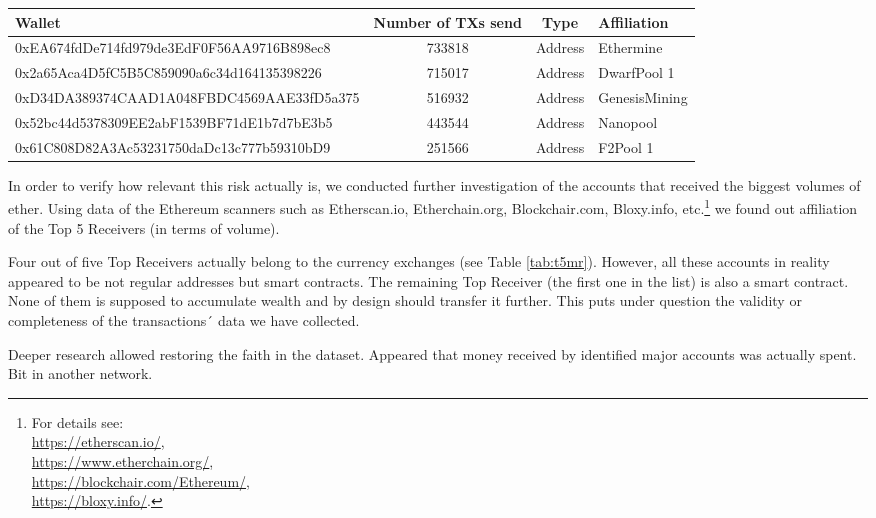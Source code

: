 \begin{table}
\centering
{}
\label{tabt5ms}
\begin{adjustbox}{width=0.9\linewidth}
\begin{tabular}{p{7cm}ccl}
  \hline
Wallet & Number of TXs send & Type & Affiliation \\
  \hline
  0xEA674fdDe714fd979de3EdF0F56AA9716B898ec8 & 733818 & Address & Ethermine \\
  0x2a65Aca4D5fC5B5C859090a6c34d164135398226 & 715017 & Address & DwarfPool 1 \\
  0xD34DA389374CAAD1A048FBDC4569AAE33fD5a375 & 516932 & Address & GenesisMining \\
  0x52bc44d5378309EE2abF1539BF71dE1b7d7bE3b5 & 443544 & Address & Nanopool \\
  0x61C808D82A3Ac53231750daDc13c777b59310bD9 & 251566 & Address & F2Pool 1 \\
   \hline
\end{tabular}
\end{adjustbox}
\end{table}

In order to verify how relevant this risk actually is, we conducted further investigation of the accounts that received the biggest volumes of ether.  
Using data of the Ethereum scanners such as Etherscan.io, Etherchain.org, Blockchair.com, Bloxy.info, etc.\footnote{For details see: \\ \url{https://etherscan.io/}, \\ \url{https://www.etherchain.org/}, \\ \url{https://blockchair.com/Ethereum/}, \\ \url{https://bloxy.info/}.} we found out affiliation of the Top 5 Receivers (in terms of volume).

Four out of five Top Receivers actually belong to the currency exchanges (see Table \ref{tab:t5mr}).
However, all these accounts in reality appeared to be not regular addresses but smart contracts.
The remaining Top Receiver (the first one in the list) is also a smart contract.
None of them is supposed to accumulate wealth and by design should transfer it further.
This puts under question the validity or completeness of the transactions´ data we have collected.

Deeper research allowed restoring the faith in the dataset.
Appeared that money received by identified major accounts was actually spent.
Bit in another network.

